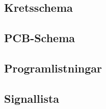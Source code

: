 \documentclass[a4paper,11pt]{article}
\begin{document}
	\subsection{Kretsschema}

	\subsection{PCB-Schema}

	\subsection{Programlistningar}

	\subsection{Signallista}
\end{document}
